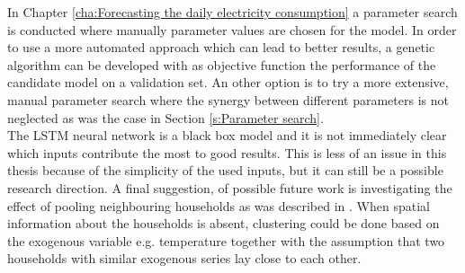 In Chapter \ref{cha:Forecasting the daily electricity consumption} a parameter search is conducted where manually parameter values are chosen for the model. In order to use a more automated approach which can lead to better results, a genetic algorithm can be developed with as objective function the performance of the candidate model on a validation set. An other option is to try a more extensive, manual parameter search where the synergy between different parameters is not neglected as was the case in Section \ref{s:Parameter search}.\\ The LSTM neural network is a black box model and it is not immediately clear which inputs contribute the most to good results. This is less of an issue in this thesis because of the simplicity of the used inputs, but it can still be a possible research direction. A final suggestion, of possible future work is investigating the effect of pooling neighbouring households as was described in \cite{Shi2018}. When spatial information about the households is absent, clustering could be done based on the exogenous variable e.g. temperature together with the assumption that two households with similar exogenous series lay close to each other. 





